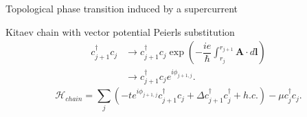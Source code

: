 \documentclass[xcolor=dvipsnames,10pt,aspectratio=169]{beamer}
\renewcommand{\vec}[1]{\mathbf{#1}}
\newcommand{\ham}{\mathcal{H}}
\newcommand{\cc}{c^{\dagger}}
\newcommand{\de}{\Delta}
\begin{document}
  \begin{frame}{Topological phase transition induced by a supercurrent}
    \centering
  \end{frame}

  \begin{frame}{Kitaev chain with vector potential}
    Peierls substitution
    \begin{align}
      \cc_{j+1} c_j &\rightarrow \cc_{j+1} c_j \exp \left(-\dfrac{i e}{\hbar} \int_{r_j}^{r_{j+1}} \vec{A} \cdot d\vec{l} \right) \\ \nonumber
      &\rightarrow \cc_{j+1} c_j e^{i \phi_{j+1,j}}.
    \end{align}
    \begin{equation} \label{eq: Peierls chain}
      \ham_{chain} = \sum_j (-t e^{i\phi_{j+1,j}} \cc_{j+1} c_j + \de \cc_{j+1}\cc_j + h.c.) - \mu \cc_j c_j.
    \end{equation}
  \end{frame}
\end{document}
